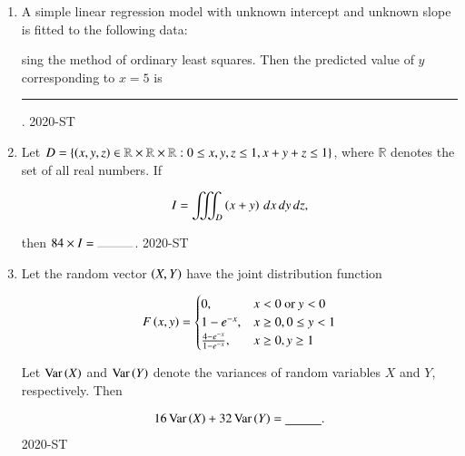 \documentclass[journal,12pt,onecolumn]{IEEEtran}
\theoremstyle{remark}
\begin{document}
\begin{enumerate}
\item A simple linear regression model with unknown intercept and unknown slope is fitted to the following data:
	\begin{table}[ht]
		\centering
		
	\end{table}
sing the method of ordinary least squares. Then the predicted value of $y$ corresponding to $x=5$ is \rule{1cm}{0.2pt}.
\hfill{2020-ST}


\item Let $ D = \{ \left(x, y, z\right) \in \mathbb{R} \times \mathbb{R} \times \mathbb{R} : 0 \leq x, y, z \leq 1, x + y + z \leq 1 \} $, where $ \mathbb{R} $ denotes the set of all real numbers. If

\begin{align*}
I = \iiint_D \left(x + y\right) \, dx \, dy \, dz,
\end{align*}

then $ 84 \times I = \rule{1cm}{0.2pt} $.
\hfill{2020-ST}


\item Let the random vector $ \left(X, Y\right) $ have the joint distribution function

\begin{align*}
F\left(x, y\right) = 
\begin{cases} 
0, & x < 0 \text{ or } y < 0 \\
1 - e^{-x}, & x \geq 0, 0 \leq y < 1 \\
\frac{4 - e^{-x}}{1 - e^{-x}}, & x \geq 0, y \geq 1 
\end{cases}
\end{align*}

Let $ \text{Var}\left(X\right) $ and $ \text{Var}\left(Y\right) $ denote the variances of random variables $ X $ and $ Y $, respectively. Then

\begin{align*}
16 \, \text{Var}\left(X\right) + 32 \, \text{Var}\left(Y\right) = \underline{\hspace{1cm}}.
\end{align*}
\hfill{2020-ST}

\end{enumerate}
\end{document}
